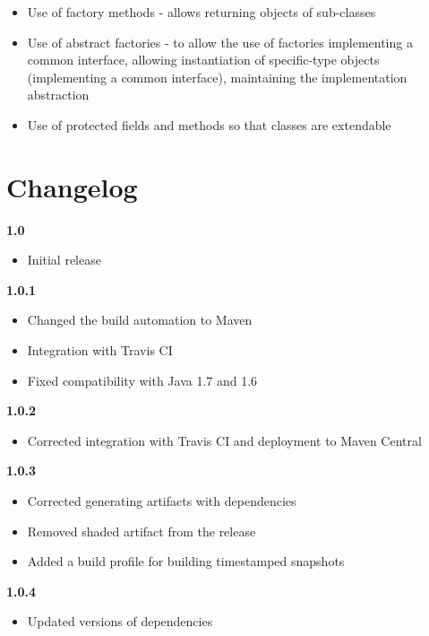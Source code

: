 \begin{itemize}
	\renewcommand{\labelitemi}{$\bullet$}
	\item Use of factory methods - allows returning objects of sub-classes
	\item Use of abstract factories - to allow the use of factories implementing a common interface, allowing instantiation of specific-type objects (implementing a common interface), maintaining the implementation abstraction
	\item Use of protected fields and methods so that classes are extendable
\end{itemize}







\chapter{Changelog}

\noindent
\textbf{1.0}
\begin{itemize}
	\renewcommand{\labelitemi}{$\bullet$}
	\item Initial release
\end{itemize}
\newline

\noindent
\textbf{1.0.1}
\begin{itemize}
	\renewcommand{\labelitemi}{$\bullet$}
	\item Changed the build automation to Maven
	\item Integration with Travis CI
	\item Fixed compatibility with Java 1.7 and 1.6
\end{itemize}
\newline

\noindent
\textbf{1.0.2}
\begin{itemize}
	\renewcommand{\labelitemi}{$\bullet$}
	\item Corrected integration with Travis CI and deployment to Maven Central
\end{itemize}
\newline

\noindent
\textbf{1.0.3}
\begin{itemize}
	\renewcommand{\labelitemi}{$\bullet$}
	\item Corrected generating artifacts with dependencies
	\item Removed shaded artifact from the release
	\item Added a build profile for building timestamped snapshots
\end{itemize}
\newline

\noindent
\textbf{1.0.4}
\begin{itemize}
	\renewcommand{\labelitemi}{$\bullet$}
	\item Updated versions of dependencies
\end{itemize}
\newline






